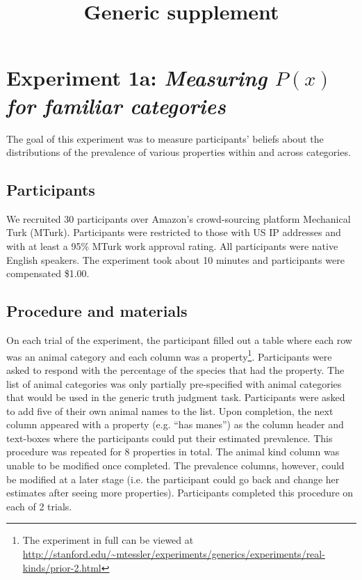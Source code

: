 \documentclass[10pt,letterpaper]{article}
\title{Generic supplement}
\begin{document}
\maketitle



\appendix


\section{Experiment 1a: \emph{Measuring $P(x)$ for familiar categories}}

The goal of this experiment was to measure participants' beliefs about the distributions of the prevalence of various properties within and across categories.

\subsection{Participants}

We recruited 30 participants over Amazon's crowd-sourcing platform Mechanical Turk (MTurk).  Participants were restricted to those with US IP addresses and with at least a 95\% MTurk work approval rating. All participants were native English speakers. The experiment took about 10 minutes and participants were compensated \$1.00.

\subsection{Procedure and materials}

On each trial of the experiment, the participant filled out a table where each row was an animal category and each column was a property\footnote{The experiment in full can be viewed at \url{http://stanford.edu/~mtessler/experiments/generics/experiments/real-kinds/prior-2.html}}. 
Participants were asked to respond with the percentage of the species that had the property.
The list of animal categories was only partially pre-specified with animal categories that would be used in the generic truth judgment task.
Participants were asked to add five of their own animal names to the list. 
Upon completion, the next column appeared with a property (e.g. ``has manes'') as the column header and text-boxes where the participants could put their estimated prevalence. 
This procedure was repeated for 8 properties in total. 
The animal kind column was unable to be modified once completed. 
The prevalence columns, however, could be modified at a later stage (i.e. the participant could go back and change her estimates after seeing more properties). 
Participants completed this procedure on each of 2 trials.
\end{document}
